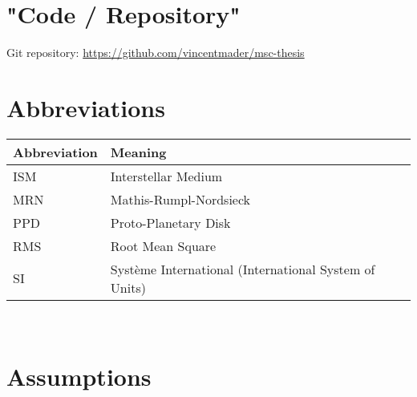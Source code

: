 \section{"Code / Repository"}

Git repository:
\url{https://github.com/vincentmader/msc-thesis} %

\section{Abbreviations}

    \begin{table}[h!]
        \begin{tabular}{|l|l|}
            \hline
            \textbf{Abbreviation}   & \textbf{Meaning} \\
            \hline
            ISM                     & Interstellar Medium \\
            \hline
            MRN                     & Mathis-Rumpl-Nordsieck \\
            \hline
            PPD                     & Proto-Planetary Disk \\
            \hline
            RMS                     & Root Mean Square \\
            \hline
            SI                      & Système International (International System of Units) \\
            \hline                  %
        \end{tabular}
    \end{table} \ \\ 

\section{Assumptions}


